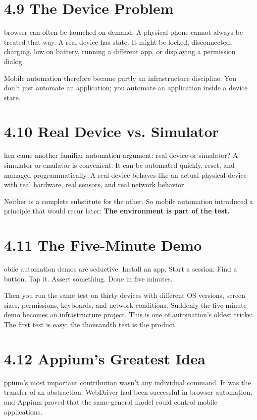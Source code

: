 \documentclass[11pt, a4paper, openany]{book}
\newcommand{\initialcap}[1]{{\fontfamily{lmss}\selectfont\huge\textbf{#1}}}
\begin{document}
\section{4.9 The Device Problem}
\noindent \initialcap{A} browser can often be launched on demand. A physical phone cannot always be treated that way. A real device has state. It might be locked, disconnected, charging, low on battery, running a different app, or displaying a permission dialog. 

Mobile automation therefore became partly an infrastructure discipline. You don't just automate an application; you automate an application inside a device state.

\section{4.10 Real Device vs. Simulator}
\noindent \initialcap{T}hen came another familiar automation argument: real device or simulator? A simulator or emulator is convenient. It can be automated quickly, reset, and managed programmatically. A real device behaves like an actual physical device with real hardware, real sensors, and real network behavior. 

Neither is a complete substitute for the other. So mobile automation introduced a principle that would recur later: \textbf{The environment is part of the test.}

\section{4.11 The Five-Minute Demo}
\noindent \initialcap{M}obile automation demos are seductive. Install an app. Start a session. Find a button. Tap it. Assert something. Done in five minutes. 

Then you run the same test on thirty devices with different OS versions, screen sizes, permissions, keyboards, and network conditions. Suddenly the five-minute demo becomes an infrastructure project. This is one of automation's oldest tricks: The first test is easy; the thousandth test is the product.

\section{4.12 Appium's Greatest Idea}
\noindent \initialcap{A}ppium's most important contribution wasn't any individual command. It was the transfer of an abstraction. WebDriver had been successful in browser automation, and Appium proved that the same general model could control mobile applications. 
\end{document}
